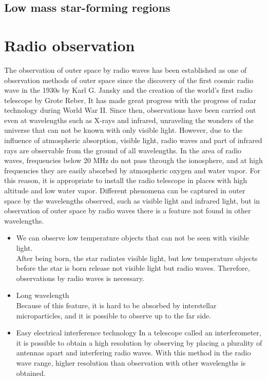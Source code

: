 \subsection{Low mass star-forming regions}



\newpage
\section{Radio observation}
The observation of outer space by radio waves has been established as one of observation methods of outer space since the discovery of the first cosmic radio wave in the 1930s by Karl G. Jansky and the creation of the world's first radio telescope by Grote Reber, It has made great progress with the progress of radar technology during World War II. Since then, observations have been carried out even at wavelengths such as X-rays and infrared, unraveling the wonders of the universe that can not be known with only visible light. However, due to the influence of atmospheric absorption, visible light, radio waves and part of infrared rays are observable from the ground of all wavelengths. In the area of radio waves, frequencies below 20 MHz do not pass through the ionosphere, and at high frequencies they are easily absorbed by atmospheric oxygen and water vapor. For this reason, it is appropriate to install the radio telescope in places with high altitude and low water vapor. Different phenomena can be captured in outer space by the wavelengths observed, such as visible light and infrared light, but in observation of outer space by radio waves there is a feature not found in other wavelengths.

\begin{itemize}
\item We can observe low temperature objects that can not be seen with visible light.\\
After being born, the star radiates visible light, but low temperature objects before the star is born 
release not visible light but radio waves. Therefore, observations by radio waves is necessary.

\item Long wavelength\\
Because of this feature, it is hard to be absorbed by interstellar microparticles, and it is possible to observe up to the far side.

\item Easy electrical interference technology
In a telescope called an interferometer, it is possible to obtain a high resolution by observing by placing a plurality of antennas apart and interfering radio waves. With this method in the radio wave range, higher resolution than observation with other wavelengths is obtained.
\end{itemize}

